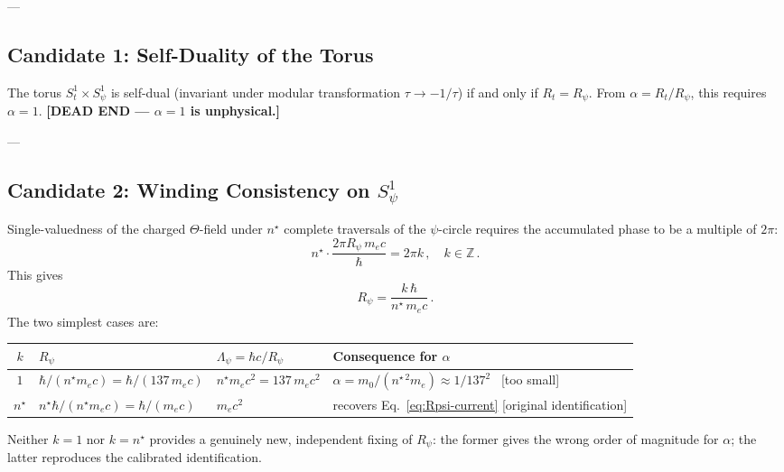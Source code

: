 ---

\subsection{Candidate 1: Self-Duality of the Torus}

The torus $S^1_t\times S^1_\psi$ is self-dual (invariant under modular transformation
$\tau\to-1/\tau$) if and only if $R_t = R_\psi$.  From $\alpha = R_t/R_\psi$, this
requires $\alpha=1$.  \textbf{[DEAD END — $\alpha=1$ is unphysical.]}

---

\subsection{Candidate 2: Winding Consistency on $S^1_\psi$}
\label{sec:winding-consistency}

Single-valuedness of the charged $\Theta$-field under $n^\star$ complete traversals
of the $\psi$-circle requires the accumulated phase to be a multiple of $2\pi$:
\begin{equation}
  n^\star \cdot \frac{2\pi R_\psi \, m_e c}{\hbar} = 2\pi k\,,\quad k\in\mathbb{Z}\,.
  \label{eq:winding-consistency}
\end{equation}
This gives
\begin{equation}
  R_\psi = \frac{k\,\hbar}{n^\star\, m_e c}\,.
  \label{eq:Rpsi-winding}
\end{equation}
The two simplest cases are:

\begin{center}
\begin{tabular}{|c|l|l|l|}
\hline
$k$ & $R_\psi$ & $\Lambda_\psi = \hbar c/R_\psi$ & Consequence for $\alpha$ \\
\hline
$1$ & $\hbar/(n^\star m_e c)=\hbar/(137\,m_e c)$ & $n^\star m_e c^2 = 137\,m_e c^2$ &
  $\alpha = m_0/(n^{\star\,2} m_e) \approx 1/137^2$ \ [too small] \\
$n^\star$ & $n^\star\hbar/(n^\star m_e c)=\hbar/(m_e c)$ & $m_e c^2$ &
  recovers Eq.~\eqref{eq:Rpsi-current} [original identification] \\
\hline
\end{tabular}
\end{center}

Neither $k=1$ nor $k=n^\star$ provides a genuinely new, independent fixing of $R_\psi$:
the former gives the wrong order of magnitude for $\alpha$; the latter reproduces
the calibrated identification.

